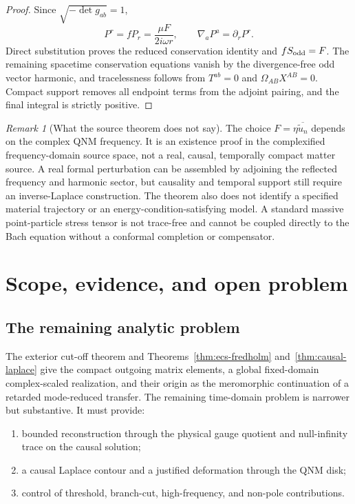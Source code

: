 \documentclass[11pt]{article}
\theoremstyle{remark}
\newtheorem{remark}[theorem]{Remark}
\begin{document}
\begin{proof}
Since \(\sqrt{-\det g_{ab}}=1\),
\[
 P^r=fP_r=\frac{\mu F}{2i\omega r},
\qquad
 \nabla_aP^a=\partial_rP^r.
\]
Direct substitution proves the reduced conservation identity and
\(fS_{\rm odd}=F\).  The remaining spacetime conservation equations
vanish by the divergence-free odd vector harmonic, and tracelessness
follows from \(T^{ab}=0\) and
\(\Omega_{AB}X^{AB}=0\).  Compact support removes all endpoint terms from
the adjoint pairing, and the final integral is strictly positive.
\end{proof}

\begin{remark}[What the source theorem does not say]
The choice \(F=\eta\overline{\widetilde u_n}\) depends on the complex QNM
frequency.  It is an existence proof in the complexified
frequency-domain source space, not a real, causal, temporally compact
matter source.  A real formal perturbation can be assembled by adjoining
the reflected frequency and harmonic sector, but causality and temporal
support still require an inverse-Laplace construction.  The theorem also
does not identify a specified material trajectory or an
energy-condition-satisfying model.  A standard massive point-particle
stress tensor is not trace-free and cannot be coupled directly to the
Bach equation without a conformal completion or compensator.
\end{remark}

\section{Scope, evidence, and open problem}
\label{sec:scope}

\subsection{The remaining analytic problem}

The exterior cut-off theorem and Theorems~\ref{thm:ecs-fredholm}
and~\ref{thm:causal-laplace} give the compact outgoing matrix elements, a
global fixed-domain complex-scaled realization, and their origin as the
meromorphic continuation of a retarded mode-reduced transfer.  The
remaining time-domain problem is narrower but substantive.  It must
provide:
\begin{enumerate}
\item bounded reconstruction through the physical gauge quotient and
  null-infinity trace on the causal solution;
\item a causal Laplace contour and a justified deformation through the
  QNM disk;
\item control of threshold, branch-cut, high-frequency, and non-pole
  contributions.
\end{enumerate}
\end{document}
